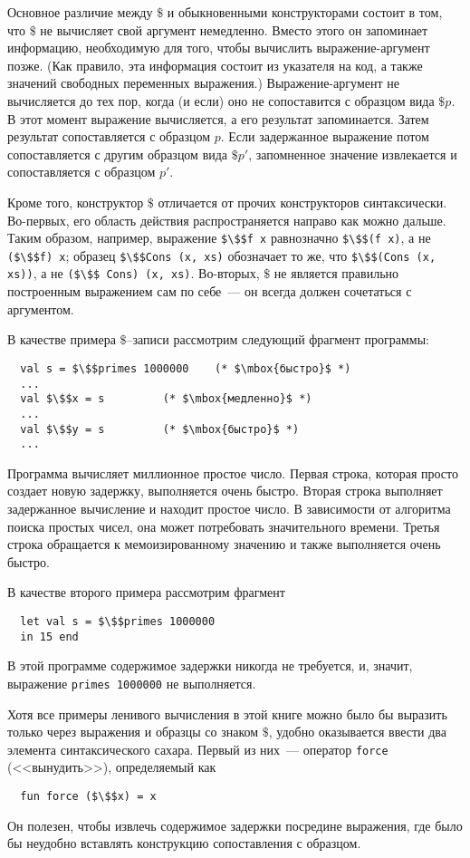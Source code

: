 Основное различие между $\$$ и обыкновенными конструкторами состоит в
том, что $\$$ не вычисляет свой аргумент немедленно.  Вместо этого он
запоминает информацию, необходимую для того, чтобы вычислить
выражение-аргумент позже. (Как правило, эта информация состоит из
указателя на код, а также значений свободных переменных выражения.)
Выражение-аргумент не вычисляется до тех пор, когда (и если) оно не
сопоставится с образцом вида $\$p$.  В этот момент выражение
вычисляется, а его результат запоминается. Затем результат
сопоставляется с образцом $p$. Если задержанное выражение потом
сопоставляется с другим образцом вида $\$p'$, запомненное значение
извлекается и сопоставляется с образцом $p'$.

Кроме того, конструктор $\$$ отличается от прочих конструкторов
синтаксически. Во-первых, его область действия распространяется
направо как можно дальше. Таким образом, например, выражение
\lstinline!$\$$f x! равнозначно \lstinline!$\$$(f x)!, а не 
\lstinline!($\$$f) x!; образец \lstinline!$\$$Cons (x, xs)! обозначает
то же, что \lstinline!$\$$(Cons (x, xs))!, а не 
\lstinline!($\$$ Cons) (x, xs)!. Во-вторых, $\$$ не является правильно
построенным выражением сам по себе~--- он всегда должен сочетаться с
аргументом.

В качестве примера $\$$--записи рассмотрим следующий фрагмент
программы: 
\begin{lstlisting}
  val s = $\$$primes 1000000	(* $\mbox{быстро}$ *)
  ...
  val $\$$x = s			(* $\mbox{медленно}$ *)
  ...
  val $\$$y = s			(* $\mbox{быстро}$ *)
  ...
\end{lstlisting}
Программа вычисляет миллионное простое число. Первая строка, которая
просто создает новую задержку, выполняется очень
быстро.  Вторая строка выполняет задержанное вычисление и
находит простое число. В зависимости от алгоритма
поиска простых чисел, она может потребовать значительного
времени.  Третья строка обращается к мемоизированному значению и также
выполняется очень быстро.

В качестве второго примера рассмотрим фрагмент
\begin{lstlisting}
  let val s = $\$$primes 1000000
  in 15 end
\end{lstlisting}
В этой программе содержимое задержки никогда не
требуется, и, значит, выражение \lstinline!primes 1000000! не
выполняется.

Хотя все примеры ленивого вычисления в этой книге можно было бы
выразить только через выражения и образцы со знаком $\$$, удобно
оказывается ввести два элемента синтаксического сахара. Первый из них~---
оператор \lstinline!force! (<<вынудить>>), определяемый как
\begin{lstlisting}
  fun force ($\$$x) = x
\end{lstlisting}
Он полезен, чтобы извлечь содержимое задержки посредине
выражения, где было бы неудобно вставлять конструкцию сопоставления с
образцом.


